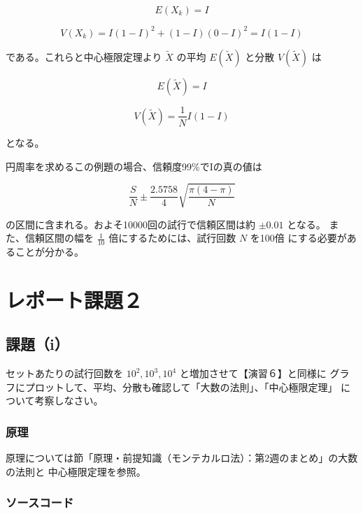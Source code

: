 \documentclass[10pt,a4paper,titlepage]{jreport} %
\begin{document}
\begin{equation}
E(X_k) = I
\end{equation}

\begin{equation}
V(X_k) = I(1 - I)^2 + (1 - I)(0 - I)^2 = I(1 - I)
\end{equation}

である。これらと中心極限定理より $\widetilde{X}$ の平均 $E(\widetilde{X})$ 
と分散 $V(\widetilde{X})$ は

\begin{equation}
E(\widetilde{X}) = I
\end{equation}

\begin{equation}
V(\widetilde{X}) = \frac{1}{N}I(1 - I)
\end{equation}

となる。

円周率を求めるこの例題の場合、信頼度99\%でIの真の値は

\begin{equation}
\frac{S}{N} \pm \frac{2.5758}{4}\sqrt{\frac{\pi(4 - \pi)}{N}}
\end{equation}

の区間に含まれる。およそ10000回の試行で信頼区間は約 $\pm 0.01$ となる。
また、信頼区間の幅を $\frac{1}{10}$ 倍にするためには、試行回数 $N$ を100倍
にする必要があることが分かる。

\section{レポート課題２}
\subsection{課題（i）}

セットあたりの試行回数を $10^2, 10^3, 10^4$ と増加させて【演習６】と同様に
グラフにプロットして、平均、分散も確認して「大数の法則」、「中心極限定理」
について考察しなさい。

\subsubsection{原理}

原理については節「原理・前提知識（モンテカルロ法）：第2週のまとめ」の大数の法則と
中心極限定理を参照。

\subsubsection{ソースコード}
\end{document}
